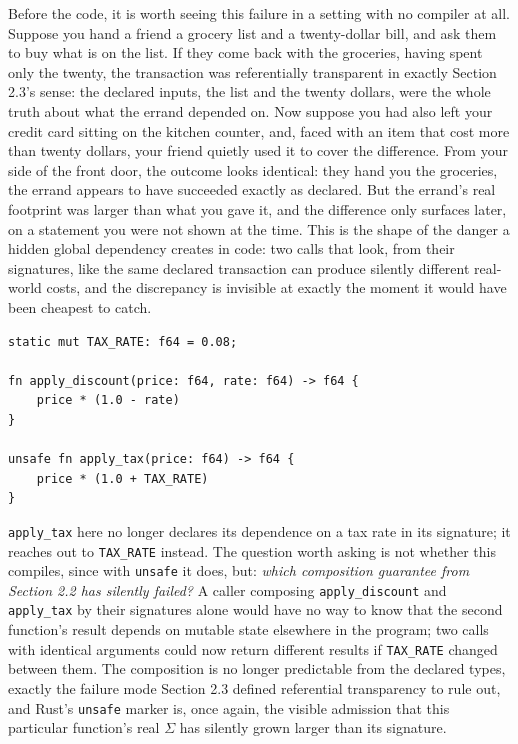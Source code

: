\documentclass[11pt]{book}
\begin{document}
Before the code, it is worth seeing this failure in a setting with no compiler at all. Suppose you hand a friend a grocery list and a twenty-dollar bill, and ask them to buy what is on the list. If they come back with the groceries, having spent only the twenty, the transaction was referentially transparent in exactly Section 2.3's sense: the declared inputs, the list and the twenty dollars, were the whole truth about what the errand depended on. Now suppose you had also left your credit card sitting on the kitchen counter, and, faced with an item that cost more than twenty dollars, your friend quietly used it to cover the difference. From your side of the front door, the outcome looks identical: they hand you the groceries, the errand appears to have succeeded exactly as declared. But the errand's real footprint was larger than what you gave it, and the difference only surfaces later, on a statement you were not shown at the time. This is the shape of the danger a hidden global dependency creates in code: two calls that look, from their signatures, like the same declared transaction can produce silently different real-world costs, and the discrepancy is invisible at exactly the moment it would have been cheapest to catch.

\begin{lstlisting}
static mut TAX_RATE: f64 = 0.08;

fn apply_discount(price: f64, rate: f64) -> f64 {
    price * (1.0 - rate)
}

unsafe fn apply_tax(price: f64) -> f64 {
    price * (1.0 + TAX_RATE)
}
\end{lstlisting}

\texttt{apply\_tax} here no longer declares its dependence on a tax rate in its signature; it reaches out to \texttt{TAX\_RATE} instead. The question worth asking is not whether this compiles, since with \texttt{unsafe} it does, but: \emph{which composition guarantee from Section 2.2 has silently failed?} A caller composing \texttt{apply\_discount} and \texttt{apply\_tax} by their signatures alone would have no way to know that the second function's result depends on mutable state elsewhere in the program; two calls with identical arguments could now return different results if \texttt{TAX\_RATE} changed between them. The composition is no longer predictable from the declared types, exactly the failure mode Section 2.3 defined referential transparency to rule out, and Rust's \texttt{unsafe} marker is, once again, the visible admission that this particular function's real $\Sigma$ has silently grown larger than its signature.
\end{document}
